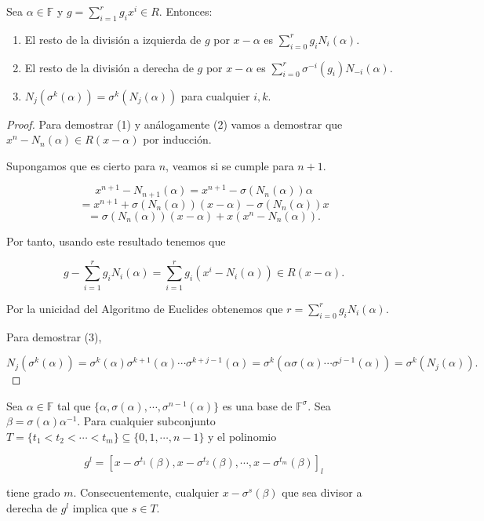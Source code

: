 \begin{lemma}
\label{le:veinticinco}
  Sea $\alpha \in \mathbb{F}$ y $g = \sum_{i=1}^r g_ix^i \in R$. Entonces:
  \begin{enumerate}
      \item El resto de la división a izquierda de $g$ por $x-\alpha$ es $\sum_{i=0}^r g_iN_i(\alpha)$.
      \item El resto de la división a derecha de $g$ por $x-\alpha$ es $\sum_{i=0}^r \sigma^{-i}(g_i)N_{-i}(\alpha)$.
      \item $N_j(\sigma^k(\alpha)) = \sigma^k(N_j(\alpha))$ para cualquier $i,k$.
  \end{enumerate}
\end{lemma}

\begin{proof}
    Para demostrar (1) y análogamente (2) vamos a demostrar que $x^n - N_n(\alpha) \in R(x-\alpha)$ por inducción.

    Supongamos que es cierto para $n$, veamos si se cumple para $n+1$.
    
    \[ x^{n+1} - N_{n+1}(\alpha) = x^{n+1} - \sigma(N_{n}(\alpha))\alpha \]
    \[ = x^{n+1} + \sigma(N_{n}(\alpha))(x-\alpha) - \sigma(N_{n}(\alpha))x  \]
    \[  = \sigma(N_{n}(\alpha))(x-\alpha) + x(x^n - N_n(\alpha)). \]

Por tanto, usando este resultado tenemos que

\[ g - \sum_{i=1}^r g_i N_i(\alpha) = \sum_{i=1}^r g_i(x^i - N_i(\alpha)) \in R(x-\alpha) . \]

Por la unicidad del Algoritmo de Euclides obtenemos que $r = \sum_{i=0}^r g_iN_i(\alpha)$. \cite{Vandermonde}

Para demostrar (3),

$N_j(\sigma^k(\alpha)) = \sigma^k(\alpha)\sigma^{k+1}(\alpha)\cdots \sigma^{k+j-1}(\alpha) = \sigma^k(\alpha\sigma(\alpha)\cdots \sigma^{j-1}(\alpha)) = \sigma^k(N_j(\alpha)). $
\end{proof}

\begin{lemma}
\label{le:dos}
  Sea $\alpha \in \mathbb{F}$ tal que $\{ \alpha, \sigma(\alpha),\cdots,\sigma^{n-1}(\alpha)\}$ es una base de $\mathbb{F}^{\sigma}$. Sea $\beta = \sigma(\alpha)\alpha^{-1}$. Para cualquier subconjunto $T = \{ t_1 < t_2 < \cdots < t_m \} \subseteq \{ 0,1,\cdots,n-1 \}$ y el polinomio 
 
  \[ g^l = [x - \sigma^{t_1}(\beta),x - \sigma^{t_2}(\beta),\cdots, x - \sigma^{t_m}(\beta) ]_l \]

tiene grado $m$. Consecuentemente, cualquier $x - \sigma^s(\beta)$ que sea divisor a derecha de $g^l$ implica que $s \in T$.
\end{lemma}

